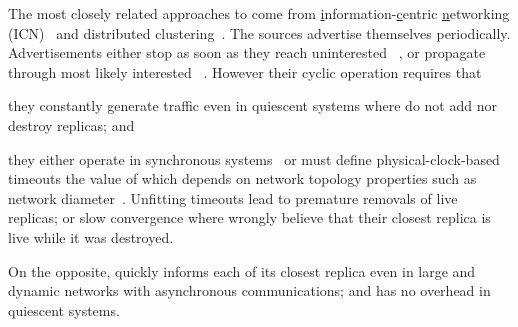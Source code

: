 \begin{asparadesc}


\noindent The most closely related approaches to \NAME come from
\underline{i}nformation-\underline{c}entric \underline{n}etworking
(ICN)~\cite{garcia-lopez,hemmati2015namebased} and distributed
clustering~\cite{sohier2012physarum}. The sources advertise themselves
periodically. Advertisements either stop as soon as they reach
uninterested \processes~\cite{garcia-lopez,hemmati2015namebased}, or
propagate through most likely interested
\processes~\cite{sohier2012physarum}. However their cyclic operation
requires that
\begin{inparaenum}[(i)]
\item they constantly generate traffic even in quiescent systems where
  \processes do not add nor destroy replicas; and 
\item they either operate in synchronous
  systems~\cite{barjon2014maintaining,sohier2012physarum} or must define
  physical-clock-based timeouts the value of which depends on network
  topology properties such as network diameter~\cite{garcia-lopez,hemmati2015namebased}.
  Unfitting timeouts lead to premature removals of live replicas; or
  slow convergence where \processes wrongly believe that their closest
  replica is live while it was destroyed.
\end{inparaenum}
On the opposite, \NAME quickly informs each \process of its closest
replica even in large and dynamic networks with asynchronous
communications; and has no overhead in quiescent systems.

\end{asparadesc}


